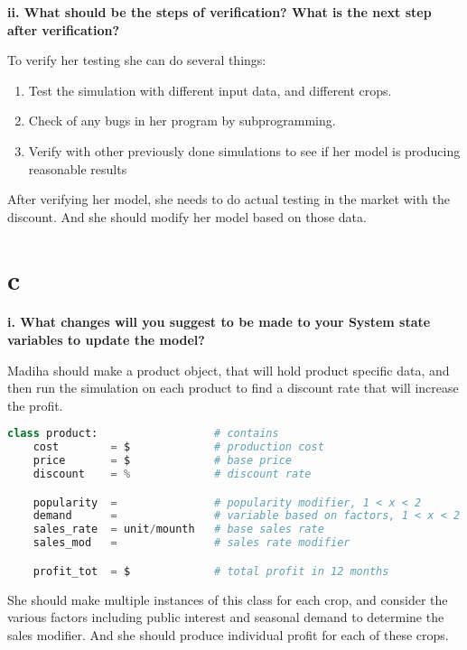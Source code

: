 \documentclass[article, 12pt, a4paper]{memoir}
\begin{document}
\textbf{ii. What should be the steps of verification? What is the next step after
verification?}
\vspace{1em}

\begin{solution}
    [b.ii]
    To verify her testing she can do several things:
    \begin{enumerate}
        \item Test the simulation with different input data, and different crops.
        \item Check of any bugs in her program by subprogramming.
        \item Verify with other previously done simulations to see if her model is
            producing reasonable results
    \end{enumerate}

    After verifying her model, she needs to do actual testing in the market with the
    discount. And she should modify her model based on those data.
\end{solution}


\section{c}

\textbf{i. What changes will you suggest to be made to your System state variables to
update the model?}
\vspace{1em}

\begin{solution}
    [c.i]
    Madiha should make a product object, that will hold product specific data, and then
    run the simulation on each product to find a discount rate that will increase the
    profit.

    \begin{lstlisting}[language=Python]
class product:                  # contains
    cost        = $             # production cost
    price       = $             # base price
    discount    = %             # discount rate

    popularity  =               # popularity modifier, 1 < x < 2
    demand      =               # variable based on factors, 1 < x < 2
    sales_rate  = unit/mounth   # base sales rate
    sales_mod   =               # sales rate modifier

    profit_tot  = $             # total profit in 12 months
    \end{lstlisting}

    She should make multiple instances of this class for each crop, and consider the
    various factors including public interest and seasonal demand to determine the sales
    modifier. And she should produce individual profit for each of these crops.
\end{solution}
\end{document}
